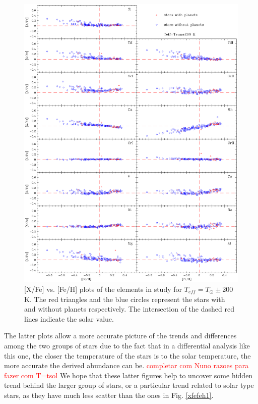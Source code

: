 \documentclass[dvips,12pt,a4paper]{report}
\begin{document}
{{\begin{figure}[h!]
\centering
\includegraphics[trim=0cm 2cm 0cm 1cm,clip,width=15 cm]{pics/parte4/xfefehfinal/xfefehtsolfinal.eps}
\caption[abundance gfx for solar temperatures]{[X/Fe] vs. [Fe/H] plots of the elements in study for $T_{eff}=T_\odot\pm$200 K. The red triangles and the blue circles represent the stars with and without planets respectively. The intersection of the dashed red lines indicate the solar value.}
\label{xfefeh2}
\end{figure}



The latter plots allow a more accurate picture of the trends and differences among the two groups of stars due to the fact that in a differential analysis like this one, the closer the temperature of the stars is to the solar temperature, the more accurate the derived abundance can be. \textcolor{red}{completar com Nuno razoes para fazer com T=tsol}  We hope that these latter figures help to uncover some  hidden trend behind the larger group of stars, or a particular trend related to solar type stars, as they have much less scatter than the ones in Fig. \ref{xfefeh1}.

}}
\end{document}
